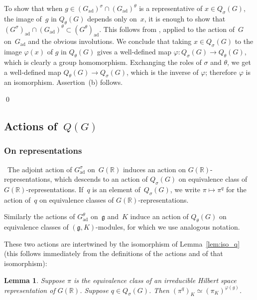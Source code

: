 \documentclass[cupthm]{CUP-JNL-JMJ}
\numberwithin{equation}{section}
\theoremstyle{cupplain}
\newtheorem{lemma}[theorem]{Lemma}
\theoremstyle{cupdefinition}
\theoremstyle{cupremark}
\theoremstyle{cupproof}
\newcommand{\ad}{\mathrm{ad}}
\newcommand{\Gad}{G_\mathrm{ad}}
\newcommand{\R}{\mathbb R}
\newcommand{\g}{\mathfrak g}
\begin{document}
To show that when $g\in (\Gad)^\sigma \cap (\Gad)^\theta$ is a representative of $x \in Q_{\sigma}(G)$,  the image of~$g$ in  $Q_\theta(G)$ depends only on~$x$, it is enough to show that  $(G^\sigma)_\ad \cap (\Gad)^\theta \subset (G^\theta)_{\ad}$. This follows from \cite[Proposition 5.4]{galois}, applied to the action of~$G$ on~$\Gad$ and the obvious involutions. We conclude that taking $x \in Q_{\sigma}(G)$ to the image $\varphi(x)$ of $g$ in $Q_{\theta}(G)$ gives a well-defined map $\varphi\colon Q_{\sigma}(G)\to Q_{\theta}(G)$, which is clearly a group homomorphism. Exchanging the roles of $\sigma$ and $\theta$, we get a well-defined map $Q_{\theta}(G) \to Q_{\sigma}(G)$, which is the inverse of $\varphi$; therefore $\varphi$ is an isomorphism. Assertion~(b) follows.

\qed


%


\subsection{Actions of~$Q(G)$}


\subsubsection{On representations}~The adjoint action of $\Gad^\sigma$ on~$G(\R)$ induces an action on $G(\R)$-representations, which descends to an action of  $Q_\sigma(G)$ on equivalence class of $G(\R)$-representations. If~$q$ is an element of~$Q_\sigma(G)$, we write $\pi \mapsto \pi^q$ for the action of~$q$ on equivalence classes of $G(\R)$-representations. 

Similarly the actions of $\Gad^\theta$ on~$\g$ and~$K$ induce an action of $Q_\theta(G)$ on equivalence classes of $(\g,K)$-modules, for which we use analogous notation.

These two actions are intertwined by the isomorphism of Lemma~\ref{lem:iso_q} (this follows immediately from the definitions of the actions and of that isomorphism): 

\begin{lemma}\label{lem:action_q}
Suppose $\pi$ is the equivalence class of an irreducible Hilbert space representation of $G(\R)$. 
Suppose $q\in Q_\sigma(G)$. 
Then $(\pi^q)_K\simeq (\pi_K)^{\varphi(g)}$.
\end{lemma}
\end{document}
